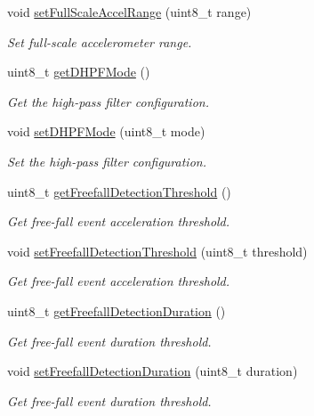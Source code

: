 \begin{DoxyCompactItemize}
void \mbox{\hyperlink{classMPU6050_a64eb78e8e359c541beaf8664db3421d1}{set\+Full\+Scale\+Accel\+Range}} (uint8\+\_\+t range)
\begin{DoxyCompactList}\small\item\em Set full-\/scale accelerometer range. \end{DoxyCompactList}\item 
uint8\+\_\+t \mbox{\hyperlink{classMPU6050_a4c3b84a906fcb5a65870fa557f797f4a}{get\+D\+H\+P\+F\+Mode}} ()
\begin{DoxyCompactList}\small\item\em Get the high-\/pass filter configuration. \end{DoxyCompactList}\item 
void \mbox{\hyperlink{classMPU6050_a44cc43aaad1e52c1ba3142d4490af611}{set\+D\+H\+P\+F\+Mode}} (uint8\+\_\+t mode)
\begin{DoxyCompactList}\small\item\em Set the high-\/pass filter configuration. \end{DoxyCompactList}\item 
uint8\+\_\+t \mbox{\hyperlink{classMPU6050_ac7f5c0511fe9d0f3525a3757498daed7}{get\+Freefall\+Detection\+Threshold}} ()
\begin{DoxyCompactList}\small\item\em Get free-\/fall event acceleration threshold. \end{DoxyCompactList}\item 
void \mbox{\hyperlink{classMPU6050_af704e1a4eb01522b146abeba78c32716}{set\+Freefall\+Detection\+Threshold}} (uint8\+\_\+t threshold)
\begin{DoxyCompactList}\small\item\em Get free-\/fall event acceleration threshold. \end{DoxyCompactList}\item 
uint8\+\_\+t \mbox{\hyperlink{classMPU6050_a3cff6b9613ad01aa1a51c287f5c5e329}{get\+Freefall\+Detection\+Duration}} ()
\begin{DoxyCompactList}\small\item\em Get free-\/fall event duration threshold. \end{DoxyCompactList}\item 
void \mbox{\hyperlink{classMPU6050_a41eeb40a654465966d260e3d31c4de4b}{set\+Freefall\+Detection\+Duration}} (uint8\+\_\+t duration)
\begin{DoxyCompactList}\small\item\em Get free-\/fall event duration threshold. \end{DoxyCompactList}\item 

\end{DoxyCompactItemize}

